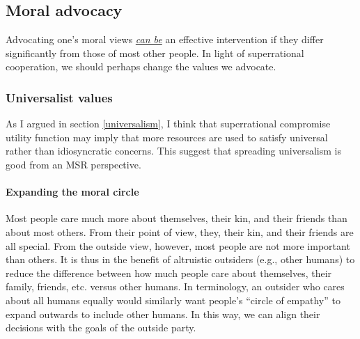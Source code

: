 \hypertarget{moral-advocacy}{\subsection{Moral
advocacy}\label{moral-advocacy}}

Advocating one's moral views
\href{http://www.utilitarian-essays.com/values-spreading.html}{\emph{can
be}} an effective intervention if they differ significantly from those
of most other people. In light of superrational cooperation, we should
perhaps change the values we advocate.

\hypertarget{universalist-values}{\subsubsection{Universalist
values}\label{universalist-values}}

As I argued in section
\ref{universalism}, I think that
superrational compromise utility function may imply that more resources
are used to satisfy universal rather than idiosyncratic concerns. This
suggest that spreading universalism is good from an MSR perspective.

\paragraph{Expanding the moral circle}\label{expanding-the-moral-circle}

Most people care much more about themselves, their kin, and their
friends than about most others. From their point of view, they, their
kin, and their friends are all special. From the outside view, however,
most people are not more important than others. It is thus in the
benefit of altruistic outsiders (e.g., other humans) to reduce the
difference between how much people care about themselves, their family,
friends, etc. versus other humans. In
\parencite{Singer2011-yx} terminology, an outsider who cares
about all humans equally would similarly want people's ``circle of
empathy'' to expand outwards to include other humans. In this way, we
can align their decisions with the goals of the outside party.

